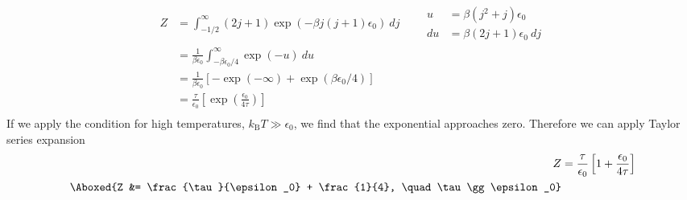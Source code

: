 \documentclass{article}
\begin{document}
\begin{enumerate}
		
		\begin{equation}
			\begin{split}
				Z &= \int_{-1/2}^{\infty} (2j + 1) \exp(-\beta j(j+1) \epsilon_0) \ dj \qquad \begin{aligned}
					u &= \beta(j^2+j)\epsilon_0 \\
					du &= \beta(2j+1)\epsilon_0 \ dj
				\end{aligned} \\
				&= \frac{1}{\beta\epsilon_0} \int_{-\beta\epsilon_0/4}^{\infty} \exp(-u) \ du \\ 
				&= \frac{1}{\beta\epsilon_0} \left[ -\exp(-\infty) + \exp(\beta\epsilon_0/4) \right] \\ 
				&= \frac{\tau}{\epsilon_0} \left[ \exp(\frac{\epsilon_0}{4\tau}) \right] \\		
			\end{split}
		\end{equation}
		If we apply the condition for high temperatures, $k_\mathrm{B}T \gg \epsilon_0$, we find that the exponential approaches zero. Therefore we can apply Taylor series expansion
		\begin{equation}
			\begin{split}
				Z &= \frac{\tau}{\epsilon_0} \left[ 1 + \frac{\epsilon_0}{4\tau} \right] \\
				\Aboxed{Z &= \frac{\tau}{\epsilon_0} + \frac{1}{4}, \quad \tau \gg \epsilon_0}
			\end{split}
		\end{equation}
		

\end{enumerate}
\end{document}
